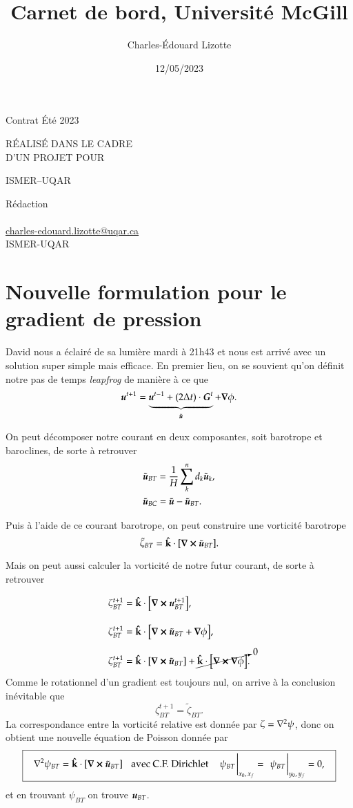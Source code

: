 \documentclass[10pt]{article}
\author{Charles-Édouard Lizotte}
\date{12/05/2023}
\title{Carnet de bord, Université McGill}
\makeatletter
\numberwithin{equation}{section}
\newcommand{\kvf}{\vb{\hat{k}}}
\newcommand{\uu}{\vb*{u}}
\newcommand{\bigno}{\vphantom{\qty(\frac{d}{q})}}
\newcommand{\pt}{\hspace{1pt}}
\newcommand{\mytitlepage}{
\begin{titlepage}
\begin{center}
{\Large Contrat Été 2023 \par}
\vspace{2cm}
{\Large \MakeUppercase{\thetitle} \par}
\vspace{2cm}
RÉALISÉ DANS LE CADRE\\ D'UN PROJET POUR \par
\vspace{2cm}
{\Large ISMER--UQAR \par}
\vspace{2cm}
{\thedate}
\end{center}
\vfill
Rédaction \\
{\theauthor}\\
\url{charles-edouard.lizotte@uqar.ca}\\
ISMER-UQAR
\end{titlepage}
}
\makeatother
\begin{document}
\mytitlepage
\tableofcontents\newpage

\section{Nouvelle formulation pour le gradient de pression}
\label{sec:org7d38319}

David nous a éclairé de sa lumière mardi à 21h43 et nous est arrivé avec un solution super simple mais efficace.
En premier lieu, on se souvient qu'on définit notre pas de temps \emph{leapfrog} de manière à ce que
\begin{equation}
 \uu^{t+1} = \underbrace{ \uu^{t-1} + (2\Delta t)\cdot \vb*{G}^t}_{\tilde{\uu}} + \gradient{\phi}.
\end{equation}

On peut décomposer notre courant en deux composantes, soit barotrope et baroclines, de sorte à retrouver
\begin{subequations}
\begin{align}
 & \tilde{\uu}_{BT} = \frac{1}{H} \sum_k^n d_k \tilde{\uu}_k, \\
 & \tilde{\uu}_{BC} = \tilde{\uu} - \tilde{\uu}_{BT}.
\end{align}
\end{subequations}

Puis à l'aide de ce courant barotrope, on peut construire une vorticité barotrope
\begin{equation}
 \tilde{\zeta}_{BT} = \kvf \cdot \qty[\curl{\tilde{\uu}_{BT}}].
\end{equation}

Mais on peut aussi calculer la vorticité de notre futur courant, de sorte à retrouver
\begin{align}
& \zeta^{t+1}_{BT} = \kvf \cdot \qty[\curl{\uu^{t+1}_{BT}}],\bigno\nonumber\\
& \zeta^{t+1}_{BT} = \kvf \cdot \qty[\curl{\tilde{\uu}_{BT} + \gradient{\phi}}],\bigno\nonumber\\
& \zeta^{t+1}_{BT} = \kvf \cdot \qty[\curl{\tilde{\uu}_{BT}}] + \cancelto{0}{\kvf\cdot\qty[\curl{\gradient{\phi}}]}.
\end{align}
Comme le rotationnel d'un gradient est toujours nul, on arrive à la conclusion inévitable que
\begin{equation}
 \zeta^{t+1}_{BT} = \tilde{\zeta}_{BT}.
\end{equation}
La correspondance entre la vorticité relative est donnée par \(\zeta = \laplacian{\psi}\), donc on obtient une nouvelle équation de Poisson donnée par
\begin{equation}
\boxed{\hspace{0.3cm}
 \laplacian{\psi_{BT}} = \kvf \cdot \qty[\curl{\tilde{\uu}_{BT}}]
 \hspace{0.31cm}\text{avec C.F. Dirichlet}\hspace{0.31cm}
 \eval{\psi_{BT}\pt}_{x_0,\pt x_f} = \ \eval{\psi_{BT}\pt}_{y_0,\pt y_f} = 0,
\hspace{0.3cm} }
\end{equation}
et en trouvant \(\psi_{BT}\) on trouve \(\uu_{BT}\). \bigskip
\end{document}
